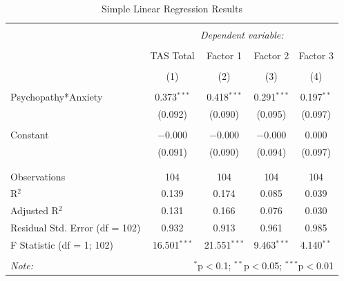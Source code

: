\documentclass[
  man,floatsintext]{apa7}
\begin{document}
\begin{table}[!htbp] \centering 
  \caption{Simple Linear Regression Results} 
  \label{tab:simple-regression-output} 
\begin{tabular}{@{\extracolsep{1pt}}lcccc} 
\\[-1.8ex]\hline 
\hline \\[-1.8ex] 
 & \multicolumn{4}{c}{\textit{Dependent variable:}} \\ 
\cline{2-5} 
\\[-1.8ex] & TAS Total & Factor 1 & Factor 2 & Factor 3 \\ 
\\[-1.8ex] & (1) & (2) & (3) & (4)\\ 
\hline \\[-1.8ex] 
 Psychopathy*Anxiety & 0.373$^{***}$ & 0.418$^{***}$ & 0.291$^{***}$ & 0.197$^{**}$ \\ 
  & (0.092) & (0.090) & (0.095) & (0.097) \\ 
  & & & & \\ 
 Constant & $-$0.000 & $-$0.000 & $-$0.000 & 0.000 \\ 
  & (0.091) & (0.090) & (0.094) & (0.097) \\ 
  & & & & \\ 
\hline \\[-1.8ex] 
Observations & 104 & 104 & 104 & 104 \\ 
R$^{2}$ & 0.139 & 0.174 & 0.085 & 0.039 \\ 
Adjusted R$^{2}$ & 0.131 & 0.166 & 0.076 & 0.030 \\ 
Residual Std. Error (df = 102) & 0.932 & 0.913 & 0.961 & 0.985 \\ 
F Statistic (df = 1; 102) & 16.501$^{***}$ & 21.551$^{***}$ & 9.463$^{***}$ & 4.140$^{**}$ \\ 
\hline 
\hline \\[-1.8ex] 
\textit{Note:}  & \multicolumn{4}{r}{$^{*}$p$<$0.1; $^{**}$p$<$0.05; $^{***}$p$<$0.01} \\ 
\end{tabular} 
\end{table}
\end{document}
